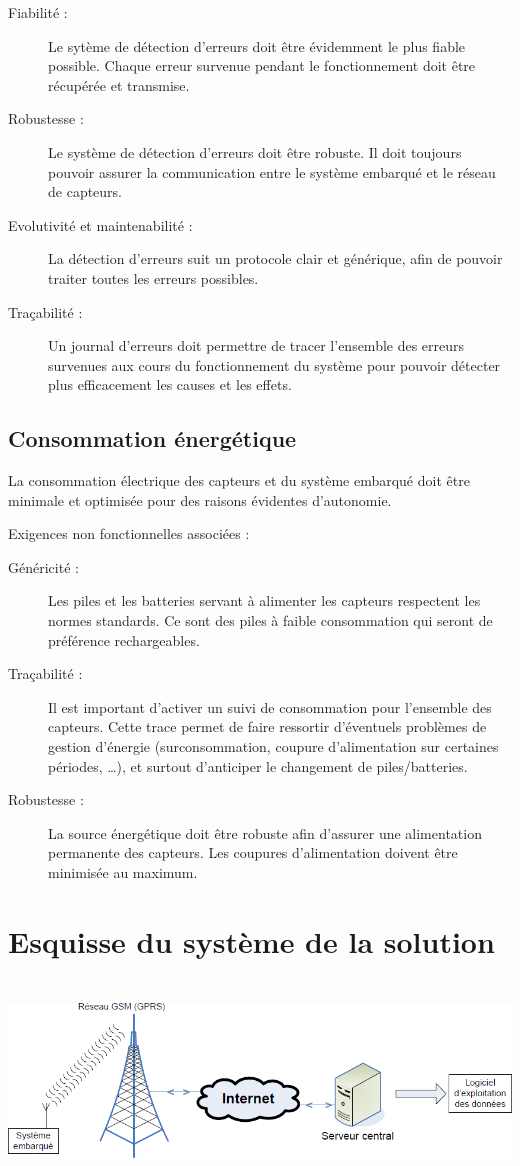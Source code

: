 \documentclass{mise_en_page}
\begin{document}
\begin{description}
\item[Fiabilité :] Le sytème de détection d’erreurs doit être évidemment
le plus fiable possible. Chaque erreur survenue pendant le
fonctionnement doit être récupérée et transmise.
\item[Robustesse :] Le système de détection d’erreurs doit être robuste.
Il doit toujours pouvoir assurer la communication entre le système
embarqué et le réseau de capteurs.
\item[Evolutivité et maintenabilité :] La détection d’erreurs suit un
protocole clair et générique, afin de pouvoir traiter toutes les
erreurs possibles.
\item[Traçabilité :] Un journal d’erreurs doit permettre de tracer
l’ensemble des erreurs survenues aux cours du fonctionnement du système
pour pouvoir détecter plus efficacement les causes et les effets.
\end{description}
\subsection{Consommation énergétique}
La consommation électrique des capteurs et du système embarqué doit être
minimale et optimisée pour des raisons évidentes d’autonomie.

Exigences non fonctionnelles associées :

\begin{description}
\item[Généricité :] Les piles et les batteries servant à alimenter les
capteurs respectent les normes standards. Ce sont des piles à faible
consommation qui seront de préférence rechargeables. 
\item[Traçabilité :] Il est important d’activer un suivi de consommation
pour l’ensemble des capteurs. Cette trace permet de faire ressortir
d’éventuels problèmes de gestion d’énergie (surconsommation, coupure
d’alimentation sur certaines périodes, …), et surtout d’anticiper le
changement de piles/batteries.
\item[Robustesse :] La source énergétique doit être robuste afin
d’assurer une alimentation permanente des capteurs. Les coupures
d’alimentation doivent être minimisée au maximum. 
\end{description}
\section{Esquisse du système de la solution}
 \includegraphics[width=17.463cm,height=5.345cm]{STB-img1.png} 
\end{document}

